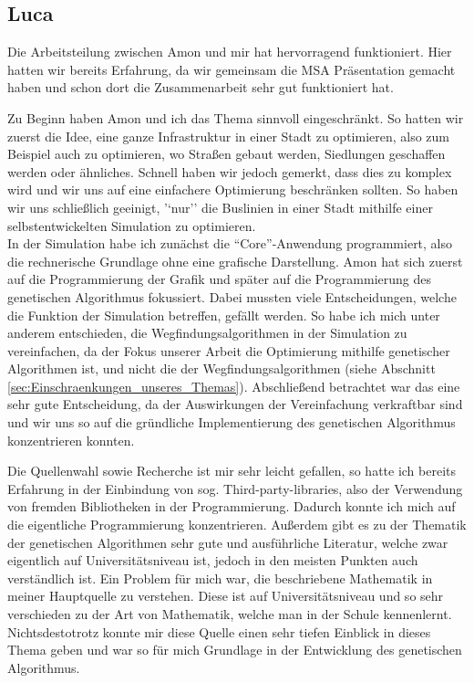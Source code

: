 \documentclass[a4paper, 11pt]{scrartcl}
\begin{document}
\newpage
\subsection{Luca}
Die Arbeitsteilung zwischen Amon und mir hat hervorragend funktioniert. Hier hatten wir bereits Erfahrung, da wir gemeinsam die MSA Präsentation gemacht haben und schon dort die Zusammenarbeit sehr gut funktioniert hat.

Zu Beginn haben Amon und ich das Thema sinnvoll eingeschränkt. So hatten wir zuerst die Idee, eine ganze Infrastruktur in einer Stadt zu optimieren, also zum Beispiel auch zu optimieren, wo Straßen gebaut werden, Siedlungen geschaffen werden oder ähnliches. Schnell haben wir jedoch gemerkt, dass dies zu komplex wird und wir uns auf eine einfachere Optimierung beschränken sollten. So haben wir uns schließlich geeinigt, '`nur'' die Buslinien in einer Stadt mithilfe einer selbstentwickelten Simulation zu optimieren.\\

In der Simulation habe ich zunächst die "`Core"'-Anwendung programmiert, also die rechnerische Grundlage ohne eine grafische Darstellung. Amon hat sich zuerst auf die Programmierung der Grafik und später auf die Programmierung des genetischen Algorithmus fokussiert. Dabei mussten viele Entscheidungen, welche die Funktion der Simulation betreffen, gefällt werden. So habe ich mich unter anderem entschieden, die Wegfindungsalgorithmen in der Simulation zu vereinfachen, da der Fokus unserer Arbeit die Optimierung mithilfe genetischer Algorithmen ist, und nicht die der Wegfindungsalgorithmen (siehe Abschnitt \ref{sec:Einschraenkungen_unseres_Themas}). Abschließend betrachtet war das eine sehr gute Entscheidung, da der Auswirkungen der Vereinfachung verkraftbar sind und wir uns so auf die gründliche Implementierung des genetischen Algorithmus konzentrieren konnten.

Die Quellenwahl sowie Recherche ist mir sehr leicht gefallen, so hatte ich bereits Erfahrung in der Einbindung von sog. Third-party-libraries, also der Verwendung von fremden Bibliotheken in der Programmierung. Dadurch konnte ich mich auf die eigentliche Programmierung konzentrieren. Außerdem gibt es zu der Thematik der genetischen Algorithmen sehr gute und ausführliche Literatur, welche zwar eigentlich auf Universitätsniveau ist, jedoch in den meisten Punkten auch verständlich ist. Ein Problem für mich war, die beschriebene Mathematik in meiner Hauptquelle \cite{gerdes2004} zu verstehen. Diese ist auf Universitätsniveau und so sehr verschieden zu der Art von Mathematik, welche man in der Schule kennenlernt. Nichtsdestotrotz konnte mir diese Quelle einen sehr tiefen Einblick in dieses Thema geben und war so für mich Grundlage in der Entwicklung des genetischen Algorithmus.\\
\end{document}
